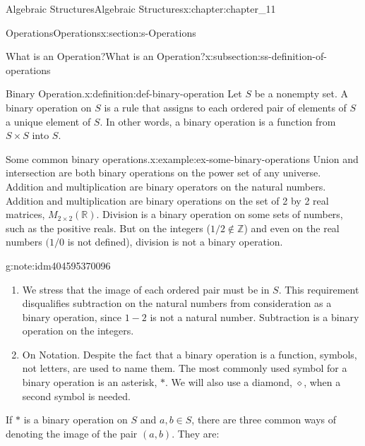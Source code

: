 \documentclass[twoside,10pt,]{book}
\numberwithin{equation}{section}
\begin{document}
\begin{chapterptx}{Algebraic Structures}{}{Algebraic Structures}{}{}{x:chapter:chapter_11}
\begin{sectionptx}{Operations}{}{Operations}{}{}{x:section:s-Operations}
\begin{introduction}{}
\end{introduction}%
%
%
\typeout{************************************************}
\typeout{************************************************}
%
\begin{subsectionptx}{What is an Operation?}{}{What is an Operation?}{}{}{x:subsection:ss-definition-of-operations}
\begin{definition}{Binary Operation.}{x:definition:def-binary-operation}%
%
\label{g:notation:idm404595375840}%
Let \(S\) be a nonempty set. A binary operation on \(S\) is a rule that assigns to each ordered pair of elements of \(S\) a unique element of \(S\). In other words, a binary operation is a function from \(S\times S\) into \(S\).%
\end{definition}
\begin{example}{Some common binary operations.}{x:example:ex-some-binary-operations}%
Union and intersection are both binary operations on the power set of any universe. Addition and multiplication are binary operators on the natural numbers. Addition and multiplication are binary operations on the set of 2 by 2 real matrices, \(M_{2\times 2}(\mathbb{R})\).  Division is a binary operation on some sets of numbers, such as the positive reals. But on the integers (\(1/2\notin \mathbb{Z}\)) and even on the real numbers \((1/0\) is not defined), division is not a binary operation.%
\end{example}
\begin{note}{}{g:note:idm404595370096}%
%
\begin{enumerate}[label=(\alph*)]
\item{}We stress that the image of each ordered pair must be in \(S\). This requirement disqualifies subtraction on the natural numbers from consideration as a binary operation, since \(1 - 2\) is not a natural number. Subtraction is a binary operation on the integers.%
\item{}On Notation. Despite the fact that a binary operation is a function, symbols, not letters, are used to name them. The most commonly used symbol for a binary operation is an asterisk, \(*\). We will also use a diamond, \(\diamond\),  when a second symbol is needed.%
\end{enumerate}
%
\end{note}
If \(*\) is a binary operation on \(S\) and \(a, b \in  S\), there are three common ways of denoting the image of the pair \((a, b)\). They are:%
\begin{equation*}

\end{equation*}
\end{subsectionptx}
\end{sectionptx}
\end{chapterptx}
\end{document}
